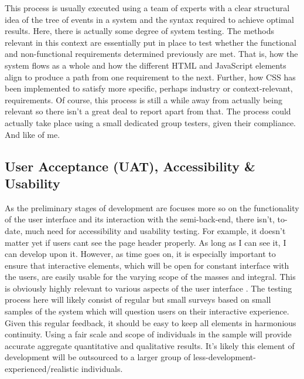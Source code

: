 \documentclass[11pt, english]{article}
\begin{document}
	This process is usually executed using a team of experts with a clear structural idea of the tree of events in a system and the syntax required to achieve optimal results. Here, there is actually some degree of system testing. The methods relevant in this context are essentially put in place to test whether the functional and non-functional requirements determined previously are met. That is, how the system flows as a whole and how the different HTML and JavaScript elements align to produce a path from one requirement to the next. Further, how CSS has been implemented to satisfy more specific, perhaps industry or context-relevant, requirements. Of course, this process is still a while away from actually being relevant so there isn't a great deal to report apart from that. The process could actually take place using a small dedicated group testers, given their compliance. And like of me.

	\subsection{User Acceptance (UAT), Accessibility \& Usability}

	As the preliminary stages of development are focuses more so on the functionality of the user interface and its interaction with the semi-back-end, there isn't, to-date, much need for accessibility and usability testing. For example, it doesn't matter yet if users cant see the page header properly. As long as I can see it, I can develop upon it. However, as time goes on, it is especially important to ensure that interactive elements, which will be open for constant interface with the users, are easily usable for the varying scope of the masses and integral. This is obviously highly relevant to various aspects of the user interface . The testing process here will likely consist of regular but small surveys based on small samples of the system which will question users on their interactive experience. Given this regular feedback, it should be easy to keep all elements in harmonious continuity. Using a fair scale and scope of individuals in the sample will provide accurate aggregate quantitative and qualitative results. It's likely this element of development will be outsourced to a larger group of less-development-experienced/realistic individuals.\\
	
\end{document}
